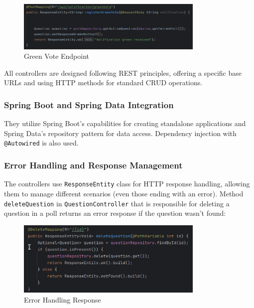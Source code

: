 \begin{figure}[h]
  \centering
  \includegraphics[width=0.80\textwidth]{figs/green_vote.png}
  \caption{Green Vote Endpoint}
  \label{fig:my_label}
\end{figure}

\noindent All controllers are designed following REST principles, offering a specific base URLs and using HTTP methods for standard CRUD operations.

\subsubsection{Spring Boot and Spring Data Integration}
They utilize Spring Boot's capabilities for creating standalone applications and Spring Data's repository pattern for data access. Dependency injection with \texttt{@Autowired} is also used.

\subsubsection{Error Handling and Response Management}
The controllers use \texttt{ResponseEntity} class for HTTP response handling, allowing them to manage different scenarios (even those ending with an error).  Method \texttt{deleteQuestion} in \texttt{QuestionController} that is responsible for deleting a question in a poll returns an error response if the question wasn't found:

\begin{figure}[h]
  \centering
  \includegraphics[width=0.80\textwidth]{figs/delete_mapping.png}
  \caption{Error Handling Response}
  \label{fig:my_label}
\end{figure}


